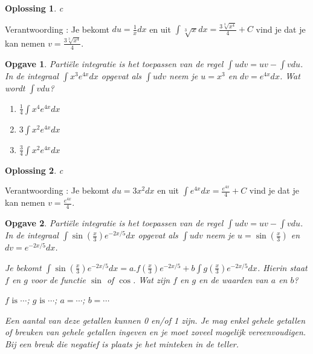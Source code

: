\documentclass{article}
\newtheorem{opgave}{Opgave}
\newtheorem*{oplossing}{Oplossing}
\begin{document}
\begin{oplossing}
c
\end{oplossing}

Verantwoording : Je bekomt $du = \frac{1}{x}dx$ en uit $\int \sqrt[3]{x}dx=\frac {3\sqrt[3]{x^4}}{4}+C$ vind je dat je kan nemen $v=\frac {3\sqrt[3]{x^4}}{4}$.


\begin{opgave}
Parti\"ele integratie is het toepassen van de regel $\int udv = uv - \int vdu$.
In de integraal $\int x^3e^{4x}dx$ opgevat als $\int udv$ neem je $u=x^3$ en $dv=e^{4x}dx$.
Wat wordt $\int vdu$?

\begin{enumerate}[a]
\item $\frac{1}{4} \int x^4e^{4x}dx$
\item $3 \int x^2e^{4x}dx$
\item $\frac{3}{4} \int x^2e^{4x}dx$
\end{enumerate}



\end{opgave}

\begin{oplossing}
c
\end{oplossing}

Verantwoording : Je bekomt $du=3x^2dx$ en uit $\int e^{4x}dx=\frac{e^{4x}}{4}+C$ vind je dat je kan nemen $v=\frac {e^{4x}}{4}$.

\begin{opgave}
Parti\"ele integratie is het toepassen van de regel $\int udv = uv - \int vdu$.
In de integraal $\int \sin \left(  \frac{x}{3} \right)e^{-2x/5}dx$ opgevat als $\int udv$ neem je $u=\sin \left( \frac{x}{3}  \right)$ en $dv=e^{-2x/5}dx$.

\noindent Je bekomt $\int \sin \left(  \frac{x}{3} \right)e^{-2x/5}dx=a.f\left(  \frac{x}{3} \right)e^{-2x/5}+b\int g\left( \frac{x}{3}  \right)e^{-2x/5}dx$. Hierin staat $f$ en $g$ voor de functie $\sin $ of $\cos $.
Wat zijn $f$ en $g$ en de waarden van $a$ en $b$?\vspace{3mm}

\noindent $f \text { is } \cdots$; $g \text { is } \cdots$; $a= \cdots$; $b=\cdots $ \vspace{1mm}

\noindent Een aantal van deze getallen kunnen 0 en/of 1 zijn. Je mag enkel gehele getallen of breuken van gehele getallen ingeven en je moet zoveel mogelijk vereenvoudigen. Bij een breuk die negatief is plaats je het minteken in de teller.
\end{opgave}
\end{document}
